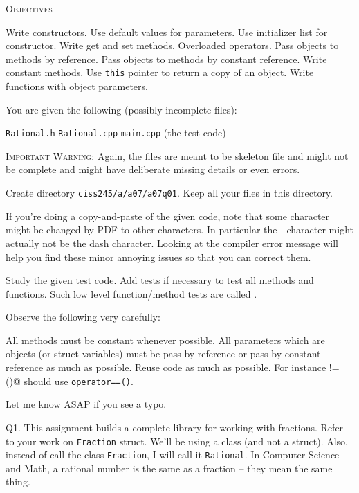 %
%




\topmatter
\textsc{Objectives}
\begin{tightlist}
    \li Write constructors. 
    \li Use default values for parameters. 
    \li Use initializer list for constructor. 
    \li Write get and set methods. 
    \li Overloaded operators. 
    \li Pass objects to methods by reference. 
    \li Pass objects to methods by constant reference.
    \li Write constant methods. 
    \li Use \texttt{this} pointer to return a copy of an object. 
    \li Write functions with object parameters.
\end{tightlist}



You are given the following (possibly incomplete files):
\begin{tightlist}
  \li \texttt{Rational.h}
  \li \texttt{Rational.cpp}
  \li \texttt{main.cpp} (the test code)
\end{tightlist}
\textsc{Important Warning:}
Again, the files are meant to be skeleton file and might not be
complete and might have deliberate missing details or even errors.

Create directory
\texttt{ciss245/a/a07/a07q01}.
Keep all your files in this directory.

If you're doing a copy-and-paste of the given code,
note that some character might be changed by PDF to other characters.
In particular the - character might actually not be the dash character.
Looking at the compiler error message will help you find these minor
annoying issues so that you can correct them.

Study the given test code.
Add tests if necessary to test all methods and functions.
Such low level function/method tests are called .

Observe the following very carefully:
\begin{tightlist}
\li All methods must be constant whenever possible. 
\li All parameters which are objects (or struct variables)
must be pass by reference or pass by constant reference as much as possible.
\li Reuse code as much as possible.
For instance \verb@operator!=()@ should use \verb!operator==()!. 
\end{tightlist}
Let me know ASAP if you see a typo.

\newpage
Q1.
This assignment builds a complete library for working with fractions.
Refer to your work on \verb!Fraction! struct.
We'll be using a class (and not a struct).
Also, instead of call the class \verb!Fraction!, I will call it
\verb!Rational!.
In Computer Science and Math, a rational number is the same as a fraction --
they mean the same thing.

